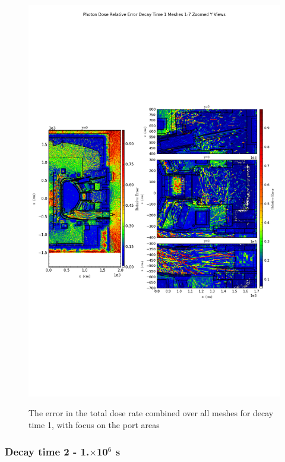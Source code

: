 \documentclass[12pt]{article}
\begin{document}
\begin{figure}[ht!]
\centering
\includegraphics[trim={0cm 9cm 0cm 10cm},clip,scale=0.75]{../plots/final_model/Photon_Dose_Relative_Error_Decay_Time_1_Meshes_1-7_Zoomed_Y_Views.png}
\label{fig:photons_dc1_no4bc_total_error_zoomed}
\caption{The error in the total dose rate combined over all meshes for decay time 1, with focus on the port areas}
\end{figure}

\clearpage
\subsubsection{Decay time 2 - 1.$\times$10$^6$ s}
\end{document}
